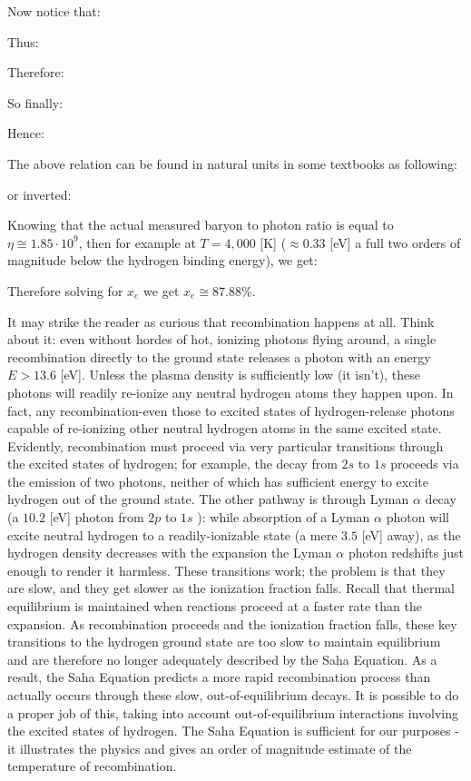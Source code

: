 	Now notice that:
	
	Thus:
	
	Therefore:
	
	So finally:
	
	Hence:
	
	\begin{tcolorbox}[title=Remark,colframe=black,arc=10pt]
	The above relation can be found in natural units in some textbooks as following:
	
	or inverted:
	
	\end{tcolorbox}
	Knowing that the actual measured baryon to photon ratio is equal to $\eta\cong 1.85 \cdot 10^{9}$, then for example at $T= 4,000$ [K] ($\approx 0.33$ [eV] a full two orders of magnitude below the hydrogen binding energy), we get:
	 
	Therefore solving for $x_e$ we get $x_e\cong 87.88\%$.
	
	It may strike the reader as curious that recombination happens at all. Think about it: even without hordes of hot, ionizing photons flying around, a single recombination directly to the ground state releases a photon with an energy $E>13.6$ [eV]. Unless the plasma density is sufficiently low (it isn't), these photons will readily re-ionize any neutral hydrogen atoms they happen upon. In fact, any recombination-even those to excited states of hydrogen-release photons capable of re-ionizing other neutral hydrogen atoms in the same excited state. Evidently, recombination must proceed via very particular transitions through the excited states of hydrogen; for example, the decay from $2s$ to $1s$ proceeds via the emission of two photons, neither of which
has sufficient energy to excite hydrogen out of the ground state. The other pathway is through Lyman $\alpha$ decay (a $10.2$ [eV] photon from $2p$ to $1s$ ): while absorption of a Lyman $\alpha$ photon will excite neutral hydrogen to a readily-ionizable state (a mere $3.5$ [eV] away), as the hydrogen density decreases with the expansion the Lyman $\alpha$ photon redshifts just enough to render it harmless. These transitions work; the problem is that they are slow, and they get slower as the ionization fraction falls. Recall that thermal equilibrium is maintained when reactions proceed at a faster rate than the expansion. As recombination proceeds and the ionization fraction falls, these key transitions to the hydrogen ground state are too slow to maintain equilibrium and are therefore no longer adequately described by the Saha Equation. As a result, the Saha Equation predicts a more rapid recombination process than actually occurs through these slow, out-of-equilibrium decays. It is possible to do a proper job of this, taking into account out-of-equilibrium interactions involving the excited states of hydrogen. The Saha Equation is sufficient for our purposes -it illustrates the physics and gives an order of magnitude estimate of the temperature of recombination.


